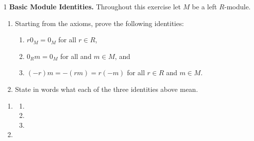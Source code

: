 \documentclass[Notebook.tex]{subfiles}
\begin{document}
\begin{problem}{1}\label{m:basic}
	\textbf{Basic Module Identities.} Throughout this exercise let $M$ be a left $R$-module.
	\begin{enumerate}[label=(\alph*),ref=\theenumi\alph*]
		\item Starting from the axioms, prove the following identities:
		\begin{enumerate}[label=(\roman*),ref=\theenumi\roman*]
			\item $r0_M=0_M$ for all $r \in R$,
			\item $0_Rm=0_M$ for all and $m\in M$, and
			\item $(-r)m = -(rm) = r(-m)$ for all $r \in R$ and $m \in M$.
		\end{enumerate}
		\item State in words what each of the three identities above mean.
	\end{enumerate}
\end{problem}

\begin{solution}
	\bbni
	\begin{enumerate}[label=(\alph*),ref=\theenumi\alph*]
		\item
		\begin{enumerate}[label=(\roman*),ref=\theenumi\roman*]
			\item
			\item
			\item
		\end{enumerate}
		\item
	\end{enumerate}
\end{solution}

\newpage
\end{document}

